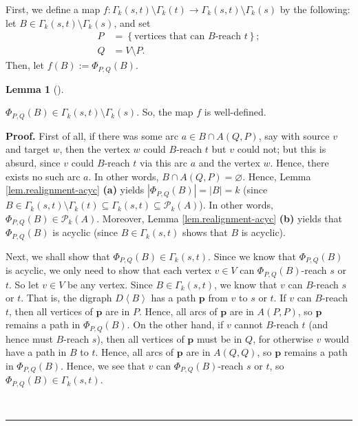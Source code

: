 \documentclass[numbers=enddot,12pt,final,onecolumn,notitlepage]{scrartcl}%
\theoremstyle{definition}
\newtheorem{lem}[theo]{Lemma}
\newenvironment{lemma}[1][]
{\begin{lem}[#1]\begin{leftbar}}
{\end{leftbar}\end{lem}}
\newenvironment{proof}[1][Proof]{\noindent\textbf{#1.} }{\ \rule{0.5em}{0.5em}}
\theoremstyle{plainsl}
\begin{document}
First, we define a map $f : \Gamma_{k}(s,t) \setminus \Gamma_{k}(t) \to \Gamma_{k}(s,t) \setminus \Gamma_{k}(s)$ by the following: let $B \in \Gamma_{k}(s,t) \setminus \Gamma_{k}(s)$, and set%
\begin{align*}
P &  =\left\{  \text{vertices that can }B\text{-reach }t\right\}  ;\\
Q &  =V\setminus P.
\end{align*} Then, let $f(B) := \Phi_{P,Q}(B)$.

\begin{lemma}
\label{claim1}
    $\Phi_{P,Q}(B) \in \Gamma_{k}(s,t) \setminus \Gamma_{k}(s)$. So, the map $f$ is well-defined.
\end{lemma}

\begin{proof}
    First of all, if there was some arc $a\in B\cap A\left(
    Q,P\right)  $, say with source $v$ and target $w$, then the vertex $w$ could
    $B$-reach $t$ but $v$ could not; but this is absurd, since $v$ could $B$-reach
    $t$ via this arc $a$ and the vertex $w$. Hence, there exists no such arc $a$.
    In other words, $B\cap A\left(  Q,P\right)  =\varnothing$. Hence, Lemma
    \ref{lem.realignment-acyc} \textbf{(a)} yields $\left\vert \Phi_{P,Q}\left(
    B\right)  \right\vert =\left\vert B\right\vert =k$ (since $B\in\Gamma
    _{k}\left(  s,t\right)  \setminus\Gamma_{k}\left(  t\right)  \subseteq
    \Gamma_{k}\left(  s,t\right)  \subseteq\mathcal{P}_{k}\left(  A\right)  $). In
    other words, $\Phi_{P,Q}\left(  B\right)  \in\mathcal{P}_{k}\left(  A\right)
    $. Moreover, Lemma \ref{lem.realignment-acyc} \textbf{(b)} yields that
    $\Phi_{P,Q}\left(  B\right)  $ is acyclic (since $B\in\Gamma_{k}\left(
    s,t\right)  $ shows that $B$ is acyclic).
    
    Next, we shall show that $\Phi_{P,Q}\left(  B\right)  \in\Gamma_{k}\left(
    s,t\right)  $. Since we know that $\Phi_{P,Q}\left(  B\right)  $ is acyclic,
    we only need to show that each vertex $v\in V$ can $\Phi_{P,Q}\left(
    B\right)  $-reach $s$ or $t$. So let $v\in V$ be any vertex. Since $B\in
    \Gamma_{k}\left(  s,t\right)  $, we know that $v$ can $B$-reach $s$ or $t$.
    That is, the digraph $D\left\langle B\right\rangle $ has a path $\mathbf{p}$
    from $v$ to $s$ or $t$. If $v$ can $B$-reach $t$, then all vertices of $\mathbf{p}$ are in $P$. Hence, all arcs of $\mathbf{p}$ are in $A(P,P)$, so $\mathbf{p}$ remains a path in $\Phi_{P,Q}(B)$. On the other hand, if $v$ cannot $B$-reach $t$ (and hence must $B$-reach $s$), then all vertices of $\mathbf{p}$ must be in $Q$, for otherwise $v$ would have a path in $B$ to $t$. Hence, all arcs of $\mathbf{p}$ are in $A(Q,Q)$, so $\mathbf{p}$ remains a path in $\Phi_{P,Q}(B)$. Hence, we see that $v$ can $\Phi_{P,Q}(B)$-reach $s$ or $t$, so $\Phi_{P,Q}(B) \in \Gamma_{k}(s,t)$.
    

\end{proof}
\end{document}
